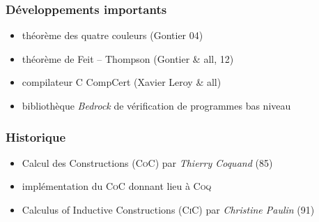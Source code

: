 \documentclass[hyperref={pdfpagelabels=false}]{beamer}
\begin{document}
\begin{frame}
  \frametitle{Développements importants}
  \begin{itemize}
    \item théorème des quatre couleurs (Gontier 04)
    \item théorème de Feit -- Thompson (Gontier \& all, 12)
    \item compilateur \textsc{C} CompCert (Xavier Leroy \& all)
    \item bibliothèque \emph{Bedrock} de vérification de programmes bas niveau
  \end{itemize}
\end{frame}

\begin{frame}
  \frametitle{Historique}
  \begin{itemize}
    \item Calcul des Constructions (\textsc{CoC}) par \emph{Thierry Coquand} (85)
    \item implémentation du \textsc{CoC} donnant lieu à \textsc{Coq}
    \item Calculus of Inductive Constructions (\textsc{CiC}) par \emph{Christine Paulin} (91)
  \end{itemize}
\end{frame}
\end{document}
